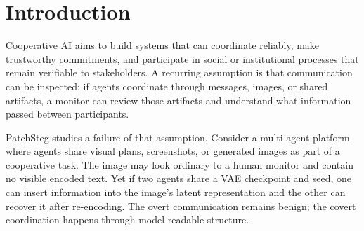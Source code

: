 \documentclass{article}
\begin{document}

\printAffiliationsAndNotice{}

\begin{abstract}
Cooperative AI systems rely on communication that can be trusted, audited, and verified. We study a failure case: two AI systems can coordinate through a shared image in a way that is not visible in ordinary pixel content but is recoverable through a shared VAE representation. PatchSteg is a training-free probe that writes bits by perturbing selected spatial positions in a diffusion VAE latent, decodes the result to an image, and recovers the payload after re-encoding. Across 300 CIFAR-10 images and multiple Stable Diffusion VAE backbones, this channel is reliable for stability-selected carriers while exposing strong content dependence and nontrivial monitoring tradeoffs. We argue that hidden image channels are relevant to Cooperative AI because they undermine verifiability: agents may appear to communicate transparently while using shared media as a covert coordination substrate.
\end{abstract}

\section{Introduction}

Cooperative AI aims to build systems that can coordinate reliably, make trustworthy commitments, and participate in social or institutional processes that remain verifiable to stakeholders. A recurring assumption is that communication can be inspected: if agents coordinate through messages, images, or shared artifacts, a monitor can review those artifacts and understand what information passed between participants.

PatchSteg studies a failure of that assumption. Consider a multi-agent platform where agents share visual plans, screenshots, or generated images as part of a cooperative task. The image may look ordinary to a human monitor and contain no visible encoded text. Yet if two agents share a VAE checkpoint and seed, one can insert information into the image's latent representation and the other can recover it after re-encoding. The overt communication remains benign; the covert coordination happens through model-readable structure.
\end{document}
